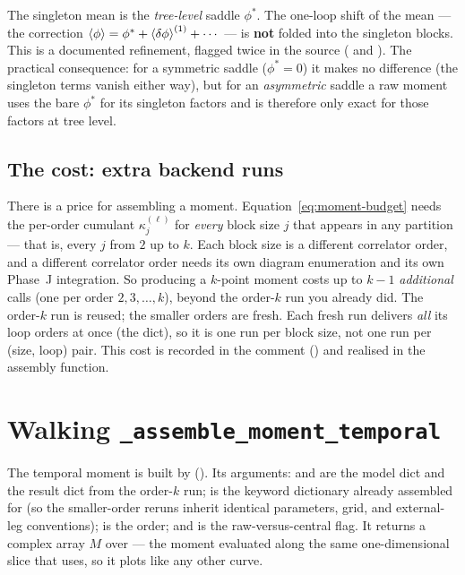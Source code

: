 \begin{gotcha}
The singleton mean is the \emph{tree-level} saddle $\phi^{*}$. The one-loop
 shift of the mean --- the correction
$\left\langle \phi \right\rangle=\phi^{*}+\left\langle \delta\phi \right\rangle^{(1)}+\cdots$ --- is \textbf{not} folded into
the singleton blocks. This is a documented refinement, flagged twice in the source
( and ). The practical
consequence: for a symmetric saddle ($\phi^{*}=0$) it makes no difference (the
singleton terms vanish either way), but for an \emph{asymmetric} saddle a raw
moment uses the bare $\phi^{*}$ for its singleton factors and is therefore only
exact for those factors at tree level.
\end{gotcha}

\subsection{The cost: extra backend runs}

There is a price for assembling a moment. Equation~\eqref{eq:moment-budget} needs
the per-order cumulant $\kappa_j^{(\ell)}$ for \emph{every} block size $j$ that
appears in any partition --- that is, every $j$ from $2$ up to $k$. Each block
size is a different correlator order, and a different correlator order needs its
own diagram enumeration and its own Phase~J integration. So producing a $k$-point
moment costs up to $k-1$ \emph{additional}  calls (one
per order $2,3,\ldots,k$), beyond the order-$k$ run you already did. The order-$k$
run is reused; the smaller orders are fresh. Each fresh run delivers \emph{all}
its loop orders at once (the  dict), so it is one run per block
size, not one run per (size, loop) pair. This cost is recorded in the
 comment () and realised
in the assembly function.

\section{Walking \texttt{\_assemble\_moment\_temporal}}\label{sec:assemble}

The temporal moment is built by  (). Its arguments: 
and  are the model dict and the result dict from the order-$k$ run;
 is the keyword dictionary already assembled for
 (so the smaller-order reruns inherit identical
parameters, grid, and external-leg conventions);  is the order; and
 is the raw-versus-central flag. It returns a complex array $M$ over
 --- the moment evaluated along the same one-dimensional
slice that  uses, so it plots like any other curve.

